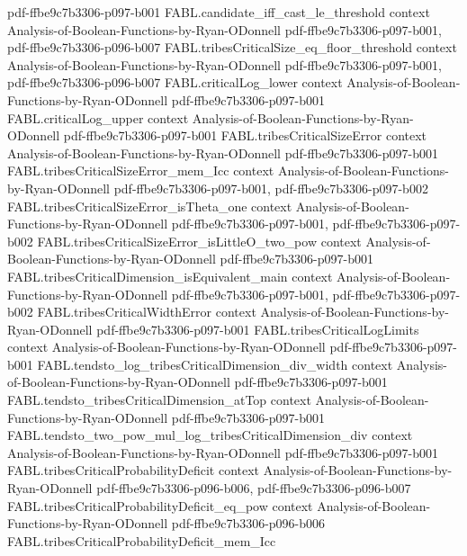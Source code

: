 \begin{theorem}
  {pdf-ffbe9c7b3306-p097-b001}
\proofstep
  {FABL.candidate_iff_cast_le_threshold}
  {context}
  {Analysis-of-Boolean-Functions-by-Ryan-ODonnell}
  {pdf-ffbe9c7b3306-p097-b001,
    pdf-ffbe9c7b3306-p096-b007}
\proofstep
  {FABL.tribesCriticalSize_eq_floor_threshold}
  {context}
  {Analysis-of-Boolean-Functions-by-Ryan-ODonnell}
  {pdf-ffbe9c7b3306-p097-b001,
    pdf-ffbe9c7b3306-p096-b007}
\proofstep
  {FABL.criticalLog_lower}
  {context}
  {Analysis-of-Boolean-Functions-by-Ryan-ODonnell}
  {pdf-ffbe9c7b3306-p097-b001}
\proofstep
  {FABL.criticalLog_upper}
  {context}
  {Analysis-of-Boolean-Functions-by-Ryan-ODonnell}
  {pdf-ffbe9c7b3306-p097-b001}
\proofstep
  {FABL.tribesCriticalSizeError}
  {context}
  {Analysis-of-Boolean-Functions-by-Ryan-ODonnell}
  {pdf-ffbe9c7b3306-p097-b001}
\proofstep
  {FABL.tribesCriticalSizeError_mem_Icc}
  {context}
  {Analysis-of-Boolean-Functions-by-Ryan-ODonnell}
  {pdf-ffbe9c7b3306-p097-b001,
    pdf-ffbe9c7b3306-p097-b002}
\proofstep
  {FABL.tribesCriticalSizeError_isTheta_one}
  {context}
  {Analysis-of-Boolean-Functions-by-Ryan-ODonnell}
  {pdf-ffbe9c7b3306-p097-b001,
    pdf-ffbe9c7b3306-p097-b002}
\proofstep
  {FABL.tribesCriticalSizeError_isLittleO_two_pow}
  {context}
  {Analysis-of-Boolean-Functions-by-Ryan-ODonnell}
  {pdf-ffbe9c7b3306-p097-b001}
\proofstep
  {FABL.tribesCriticalDimension_isEquivalent_main}
  {context}
  {Analysis-of-Boolean-Functions-by-Ryan-ODonnell}
  {pdf-ffbe9c7b3306-p097-b001,
    pdf-ffbe9c7b3306-p097-b002}
\proofstep
  {FABL.tribesCriticalWidthError}
  {context}
  {Analysis-of-Boolean-Functions-by-Ryan-ODonnell}
  {pdf-ffbe9c7b3306-p097-b001}
\proofstep
  {FABL.tribesCriticalLogLimits}
  {context}
  {Analysis-of-Boolean-Functions-by-Ryan-ODonnell}
  {pdf-ffbe9c7b3306-p097-b001}
\proofstep
  {FABL.tendsto_log_tribesCriticalDimension_div_width}
  {context}
  {Analysis-of-Boolean-Functions-by-Ryan-ODonnell}
  {pdf-ffbe9c7b3306-p097-b001}
\proofstep
  {FABL.tendsto_tribesCriticalDimension_atTop}
  {context}
  {Analysis-of-Boolean-Functions-by-Ryan-ODonnell}
  {pdf-ffbe9c7b3306-p097-b001}
\proofstep
  {FABL.tendsto_two_pow_mul_log_tribesCriticalDimension_div}
  {context}
  {Analysis-of-Boolean-Functions-by-Ryan-ODonnell}
  {pdf-ffbe9c7b3306-p097-b001}
\proofstep
  {FABL.tribesCriticalProbabilityDeficit}
  {context}
  {Analysis-of-Boolean-Functions-by-Ryan-ODonnell}
  {pdf-ffbe9c7b3306-p096-b006,
    pdf-ffbe9c7b3306-p096-b007}
\proofstep
  {FABL.tribesCriticalProbabilityDeficit_eq_pow}
  {context}
  {Analysis-of-Boolean-Functions-by-Ryan-ODonnell}
  {pdf-ffbe9c7b3306-p096-b006}
\proofstep
  {FABL.tribesCriticalProbabilityDeficit_mem_Icc}

\end{theorem}
